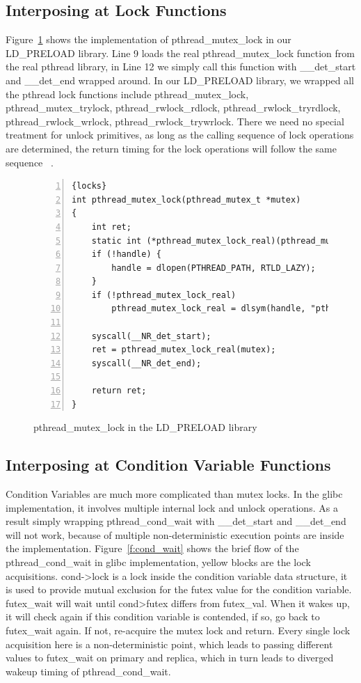 \subsection{Interposing at Lock Functions}

Figure~\ref{f:orverridelocks} shows the implementation of pthread\_mutex\_lock in our LD\_PRELOAD library. Line 9 loads the real pthread\_mutex\_lock function from the real pthread library, in Line 12 we simply call this function with \_\_det\_start and \_\_det\_end wrapped around. In our LD\_PRELOAD library, we wrapped all the pthread lock functions include pthread\_mutex\_lock, pthread\_mutex\_trylock, pthread\_rwlock\_rdlock, pthread\_rwlock\_tryrdlock, pthread\_rwlock\_wrlock, pthread\_rwlock\_trywrlock. There we need no special treatment for unlock primitives, as long as the calling sequence of lock operations are determined, the return timing for the lock operations will follow the same sequence ~\cite{merrifieldincreasing}.

\begin{figure}
\begin{lstlisting}[numbers=left, frame=single, basicstyle=\small, breaklines]{locks}
int pthread_mutex_lock(pthread_mutex_t *mutex)
{
    int ret;
    static int (*pthread_mutex_lock_real)(pthread_mutex_t *mutex) = NULL;    
    if (!handle) {
        handle = dlopen(PTHREAD_PATH, RTLD_LAZY);
    }
    if (!pthread_mutex_lock_real)
        pthread_mutex_lock_real = dlsym(handle, "pthread_mutex_lock");

    syscall(__NR_det_start);
    ret = pthread_mutex_lock_real(mutex);
    syscall(__NR_det_end);

    return ret;
}
\end{lstlisting}
\caption{pthread\_mutex\_lock in the LD\_PRELOAD library}
\label{f:orverridelocks}
\end{figure}

\subsection{Interposing at Condition Variable Functions}

Condition Variables are much more complicated than mutex locks. In the glibc implementation, it involves multiple internal lock and unlock operations. As a result simply wrapping pthread\_cond\_wait with \_\_det\_start and \_\_det\_end will not work, because of multiple non-deterministic execution points are inside the implementation. Figure~\ref{f:cond_wait} shows the brief flow of the pthread\_cond\_wait in glibc implementation, yellow blocks are the lock acquisitions. cond->lock is a lock inside the condition variable  data structure, it is used to provide mutual exclusion for the futex value for the condition variable. futex\_wait will wait until cond\->futex differs from futex\_val. When it wakes up, it will check again if this condition variable is contended, if so, go back to futex\_wait again. If not, re-acquire the mutex lock and return. Every single lock acquisition here is a non-deterministic point, which leads to passing different values to futex\_wait on primary and replica, which in turn leads to diverged wakeup timing of pthread\_cond\_wait.

